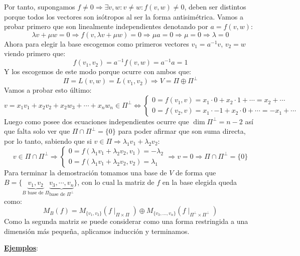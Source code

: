 \documentclass[10pt,a4paper,openright]{book}
\begin{document}
Por tanto, supongamos $f\neq 0\Rightarrow \exists v,w: v\neq w: f(v,w)\neq 0$, deben ser distintos porque todos los vectores son isótropos al ser la forma antisimétrica. Vamos a probar primero que son linealmente independientes denotando por $a=f(v,w)$:
$$\lambda v +\mu w = 0\Rightarrow f(v, \lambda v+\mu w)=0 \Rightarrow \mu a = 0\Rightarrow \mu = 0\Rightarrow \lambda =0$$
Ahora para elegir la base escogemos como primeros vectores $v_1 = a^{-1}v$, $v_2=w$ viendo primero que:
$$f(v_1,v_2)=a^{-1}f(v,w)= a^{-1}a = 1$$
Y los escogemos de este modo porque ocurre con ambos que:
$$\Pi = L(v,w)=L(v_1, v_2)\Rightarrow V = \Pi \oplus \Pi^\perp$$
Vamos a probar esto último:
$$v =x_1v_1+x_2v_2+ x_2w_3+\cdots + x_nw_n \in \Pi^\perp\Leftrightarrow\begin{cases}0 = f(v_1, v)= x_1\cdot 0 +x_2\cdot 1 + \cdots = x_2 +\cdots \\ 0 = f(v_2, v) = x_1\cdot -1 + x_2\cdot 0+ \cdots = -x_1+\cdots  \end{cases}$$
Luego como posee dos ecuaciones independientes ocurre que $\dim \Pi^\perp = n-2$ así que falta solo ver que $\Pi \cap \Pi^\perp = \{0\}$ para poder afirmar que son suma directa, por lo tanto, sabiendo que si $v\in \Pi\Rightarrow \lambda_1v_1+\lambda_2v_2$:
$$v\in \Pi\cap \Pi^\perp\Rightarrow \begin{cases}0 = f(\lambda_1v_1+\lambda_2v_2, v_1) = -\lambda_2 \\ 0 = f(\lambda_1v_1+\lambda_2v_2, v_2)=\lambda_1\end{cases}\Rightarrow v=0\Rightarrow \Pi\cap \Pi^\perp = \{0\}$$
Para terminar la demostración tomamos una base de $V$ de forma que $B=\{\underbrace{v_1,v_2}_{B\mbox{ base de }\Pi}\underbrace{v_3, \cdots , v_n}_{ \mbox{base de }\Pi^\perp}\}$, con lo cual la matriz de $f$ en la base elegida queda como:
$$M_B(f)=M_{\{v_1,v_2\}}(f\mid_{\Pi\times \Pi})\oplus M_{\{v_3, ..., v_n\}}(f\mid_{\Pi^\perp \times \Pi^\perp})$$
Como la segunda matriz se puede considerar como una forma restringida a una dimensión más pequeña, aplicamos inducción y terminamos.

\underline{\textbf{Ejemplos}}:
\end{document}
